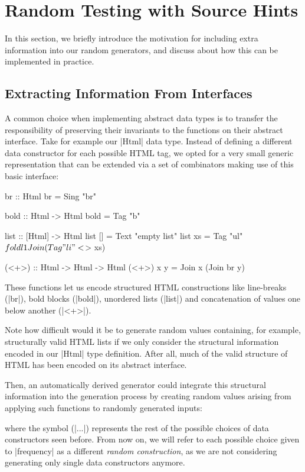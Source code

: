 \section{Random Testing with Source Hints}
\label{sec:sources}

In this section, we briefly introduce the motivation for including extra
information into our random generators, and discuss about how this can be
implemented in practice.


%
\subsection{Extracting Information From Interfaces}

A common choice when implementing abstract data types is to transfer the
responsibility of preserving their invariants to the functions on their abstract
interface.
%
Take for example our |Html| data type.
%
Instead of defining a different data constructor for each possible HTML tag, we
opted for a very small generic representation that can be extended via a set of
combinators making use of this basic interface:

\begin{code}
br :: Html
br = Sing "br"

bold :: Html -> Html
bold = Tag "b"

list :: [Html] -> Html
list []  = Text "empty list"
list xs  = Tag "ul" $ foldl1 Join (Tag "li" <$> xs)

(<+>) :: Html -> Html -> Html
(<+>) x y = Join x (Join br y)
\end{code} %
%
These functions let us encode structured HTML constructions like line-breaks
(|br|), bold blocks (|bold|), unordered lists (|list|) and concatenation of
values one below another (|<+>|).
%

Note how difficult would it be to generate random values containing, for
example, structurally valid HTML lists if we only consider the structural
information encoded in our |Html| type definition.
%
After all, much of the valid structure of HTML has been encoded on its abstract
interface.


Then, an automatically derived generator could integrate this structural
information into the generation process by creating random values arising from
applying such functions to randomly generated inputs:

%
where the symbol (|...|) represents the rest of the possible choices of data
constructors seen before.
%
From now on, we will refer to each possible choice given to |frequency| as a
different \emph{random construction}, as we are not considering generating only
single data constructors anymore.

